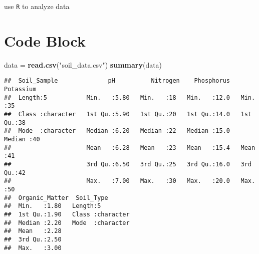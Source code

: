 \documentclass[
]{article}
\newenvironment{Shaded}{\begin{snugshade}}{\end{snugshade}}
\newcommand{\FunctionTok}[1]{\textcolor[rgb]{0.13,0.29,0.53}{\textbf{#1}}}
\newcommand{\NormalTok}[1]{#1}
\newcommand{\OtherTok}[1]{\textcolor[rgb]{0.56,0.35,0.01}{#1}}
\newcommand{\StringTok}[1]{\textcolor[rgb]{0.31,0.60,0.02}{#1}}
\begin{document}
use \texttt{R} to analyze data

\section{Code Block}\label{code-block}

\begin{Shaded}
\begin{Highlighting}[]
\NormalTok{data }\OtherTok{=} \FunctionTok{read.csv}\NormalTok{(}\StringTok{"soil\_data.csv"}\NormalTok{)}
\FunctionTok{summary}\NormalTok{(data)}
\end{Highlighting}
\end{Shaded}

\begin{verbatim}
##  Soil_Sample              pH          Nitrogen    Phosphorus     Potassium 
##  Length:5           Min.   :5.80   Min.   :18   Min.   :12.0   Min.   :35  
##  Class :character   1st Qu.:5.90   1st Qu.:20   1st Qu.:14.0   1st Qu.:38  
##  Mode  :character   Median :6.20   Median :22   Median :15.0   Median :40  
##                     Mean   :6.28   Mean   :23   Mean   :15.4   Mean   :41  
##                     3rd Qu.:6.50   3rd Qu.:25   3rd Qu.:16.0   3rd Qu.:42  
##                     Max.   :7.00   Max.   :30   Max.   :20.0   Max.   :50  
##  Organic_Matter  Soil_Type        
##  Min.   :1.80   Length:5          
##  1st Qu.:1.90   Class :character  
##  Median :2.20   Mode  :character  
##  Mean   :2.28                     
##  3rd Qu.:2.50                     
##  Max.   :3.00
\end{verbatim}
\end{document}
